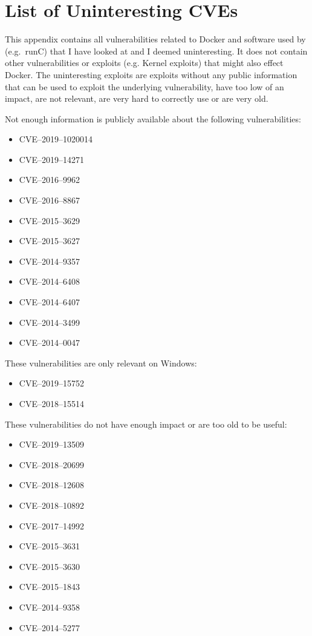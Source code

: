 \chapter{List of Uninteresting CVEs}\label{appendix:CVE-List}
This appendix contains all vulnerabilities related to Docker and software used by (e.g.\ runC) that I have looked at and I deemed uninteresting. It does not contain other vulnerabilities or exploits (e.g. Kernel exploits) that might also effect Docker. The uninteresting exploits are exploits without any public information that can be used to exploit the underlying vulnerability, have too low of an impact, are not relevant, are very hard to correctly use or are very old.

\medskip

Not enough information is publicly available about the following vulnerabilities:
\begin{multicols}{2}
    \begin{itemize}
        \item CVE--2019--1020014
        \item CVE--2019--14271
        \item CVE--2016--9962
        \item CVE--2016--8867
        \item CVE--2015--3629
        \item CVE--2015--3627
        \item CVE--2014--9357
        \item CVE--2014--6408
        \item CVE--2014--6407
        \item CVE--2014--3499
        \item CVE--2014--0047
    \end{itemize}
\end{multicols}

\medskip

These vulnerabilities are only relevant on Windows:
\begin{itemize}
    \item CVE--2019--15752
    \item CVE--2018--15514
\end{itemize}

\medskip

These vulnerabilities do not have enough impact or are too old to be useful:
\begin{itemize}
    \item CVE--2019--13509
    \item CVE--2018--20699
    \item CVE--2018--12608
    \item CVE--2018--10892
    \item CVE--2017--14992
    \item CVE--2015--3631
    \item CVE--2015--3630
    \item CVE--2015--1843
    \item CVE--2014--9358
    \item CVE--2014--5277
\end{itemize}
